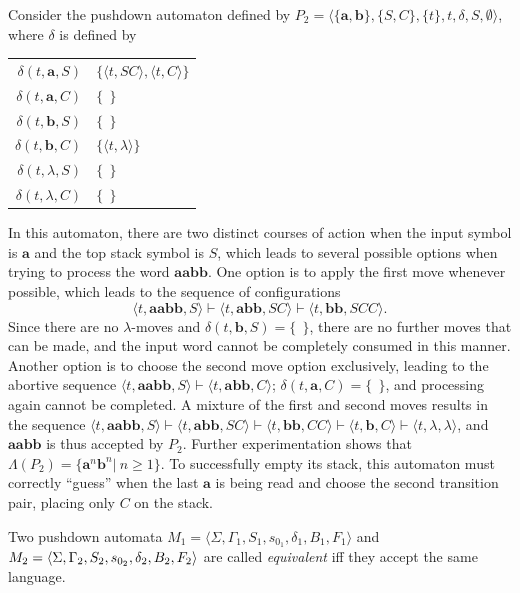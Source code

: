 Consider the pushdown automaton defined by $P_2=\langle\{\pmb{a},\pmb{b}\},\{S,
C\},\{t\},t,\delta,S,\emptyset\rangle$, where $\delta$ is defined by
\begin{center}\begin{tabular}{r@{ = }l}
$\delta(t,\pmb{a},S)$ & $\{\langle t,SC\rangle,\langle t,C\rangle\}$ \\
$\delta(t,\pmb{a},C)$ & $\{\ \ \}$ \\
$\delta(t,\pmb{b},S)$ & $\{\ \ \}$ \\
$\delta(t,\pmb{b},C)$ & $\{\langle t,\lambda\rangle\}$ \\
$\delta(t,\lambda,S)$ & $\{\ \ \}$ \\
$\delta(t,\lambda,C)$ & $\{\ \ \}$
\end{tabular}\end{center}
In this automaton, there are two distinct courses of action when the input
symbol is $\pmb{a}$ and the top stack symbol is $S$, which leads to several
possible options when trying to process the word $\pmb{aabb}$. One option is to
apply the first move whenever possible, which leads to the sequence of
configurations
\[ \langle t,\pmb{aabb},S\rangle\vdash\langle t,\pmb{abb},SC\rangle\vdash\langle
	t,\pmb{bb},SCC\rangle. \]
Since there are no $\lambda$-moves and $\delta(t,\pmb{b},S)=\{\ \ \}$, there are
no further moves that can be made, and the input word cannot be completely
consumed in this manner. Another option is to choose the second move option
exclusively, leading to the abortive sequence $\langle t,\pmb{aabb},S\rangle
\vdash\langle t,\pmb{abb},C\rangle$; $\delta(t,\pmb{a},C)=\{\ \ \}$, and
processing again cannot be completed. A mixture of the first and second moves
results in the sequence $\langle t,\pmb{aabb},S\rangle\vdash\langle t,\pmb{abb},
SC\rangle\vdash\langle t,\pmb{bb},CC\rangle\vdash\langle t,\pmb{b},C\rangle
\vdash\langle t,\lambda,\lambda\rangle$, and $\pmb{aabb}$ is thus accepted by
$P_2$. Further experimentation shows that $\Lambda(P_2)=\{\pmb{a}^n\pmb{b}^n|\ n
\geq 1\}$. To successfully empty its stack, this automaton must correctly
``guess'' when the last $\pmb{a}$ is being read and choose the second transition
pair, placing only $C$ on the stack.

\begin{dfn}\label{dfn-10.4}
Two pushdown automata $M_1=\langle\Sigma,\Gamma_1,S_1,s_{0_1},\delta_1,B_1,F_1
\rangle$ and $M_2=\langle\Sigma,\Gamma_2,S_2,s_{0_2},\delta_2,\\ B_2,F_2\rangle$
are called \emph{equivalent} iff they accept the same language.
\end{dfn}

